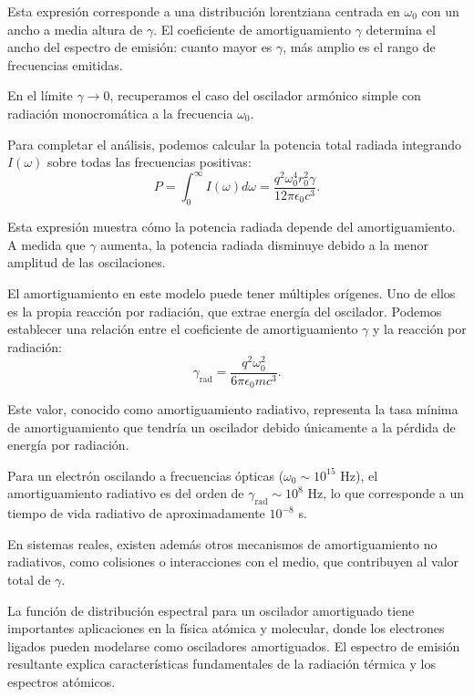 \documentclass[12pt,a4paper]{book}
\begin{document}
Esta expresión corresponde a una distribución lorentziana centrada en $\omega_0$ con un ancho a media altura de $\gamma$. El coeficiente de amortiguamiento $\gamma$ determina el ancho del espectro de emisión: cuanto mayor es $\gamma$, más amplio es el rango de frecuencias emitidas.

En el límite $\gamma \to 0$, recuperamos el caso del oscilador armónico simple con radiación monocromática a la frecuencia $\omega_0$.

Para completar el análisis, podemos calcular la potencia total radiada integrando $I(\omega)$ sobre todas las frecuencias positivas:
\begin{equation}
P = \int_0^{\infty}I(\omega)d\omega = \frac{q^2\omega_0^4r_0^2\gamma}{12\pi\epsilon_0c^3}.
\end{equation}

Esta expresión muestra cómo la potencia radiada depende del amortiguamiento. A medida que $\gamma$ aumenta, la potencia radiada disminuye debido a la menor amplitud de las oscilaciones.

El amortiguamiento en este modelo puede tener múltiples orígenes. Uno de ellos es la propia reacción por radiación, que extrae energía del oscilador. Podemos establecer una relación entre el coeficiente de amortiguamiento $\gamma$ y la reacción por radiación:
\begin{equation}
\gamma_{\text{rad}} = \frac{q^2\omega_0^2}{6\pi\epsilon_0mc^3}.
\end{equation}

Este valor, conocido como amortiguamiento radiativo, representa la tasa mínima de amortiguamiento que tendría un oscilador debido únicamente a la pérdida de energía por radiación.

Para un electrón oscilando a frecuencias ópticas ($\omega_0 \sim 10^{15}$ Hz), el amortiguamiento radiativo es del orden de $\gamma_{\text{rad}} \sim 10^8$ Hz, lo que corresponde a un tiempo de vida radiativo de aproximadamente $10^{-8}$ s.

En sistemas reales, existen además otros mecanismos de amortiguamiento no radiativos, como colisiones o interacciones con el medio, que contribuyen al valor total de $\gamma$.

La función de distribución espectral para un oscilador amortiguado tiene importantes aplicaciones en la física atómica y molecular, donde los electrones ligados pueden modelarse como osciladores amortiguados. El espectro de emisión resultante explica características fundamentales de la radiación térmica y los espectros atómicos.
\end{document}
